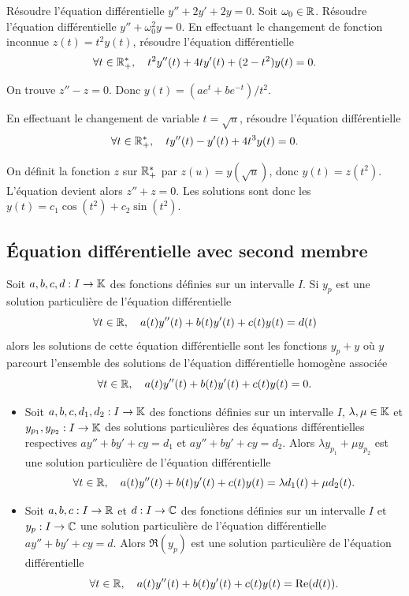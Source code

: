 \documentclass{magnolia}
\begin{document}
\begin{exos}
\exo Résoudre l'équation différentielle $y''+2y'+2y=0$.
\exo Soit $\omega_0\in\mathbb{R}$. Résoudre l'équation différentielle
  $y''+\omega_0^2 y=0$.
\exo En effectuant le changement de fonction inconnue $z(t)= t^2 y(t)$,
  résoudre l'équation différentielle
  \[\forall t\in\mathbb{R}_+^* ,\quad t^2 y''(t)+4ty'(t)+(2-t^2)y(t)=0.\]
  \begin{sol}
  On trouve $z''-z=0$. Donc $y(t)=(ae^t+be^{-t})/t^2$.
  \end{sol}
\exo En effectuant le changement de variable $t=\sqrt{u}$, résoudre
  l'équation différentielle
  \[\forall t\in\mathbb{R}_+^* ,\quad ty''(t)-y'(t)+4t^3y(t)=0.\]
  \begin{sol}
  On définit la fonction $z$ sur $\mathbb{R}_+^*$ par $z(u)=y(\sqrt{u})$, donc
  $y(t)=z(t^2)$. L'équation devient alors $z''+z=0$. Les solutions sont donc
  les $y(t)=c_1\cos(t^2)+c_2\sin(t^2)$.
  \end{sol}
\end{exos}

\subsection{Équation différentielle avec second membre}

\begin{proposition}[utile=-3,nom={Théorème de superposition}]
Soit $a,b,c,d:I\to\mathbb{K}$ des fonctions définies sur un intervalle $I$.
Si $y_p$ est une solution \og particulière \fg de l'équation différentielle
\[\forall t\in\mathbb{R} ,\quad a(t)y''(t)+b(t)y'(t)+c(t)y(t)=d(t)\]
alors les solutions de cette équation différentielle sont les fonctions $y_p+y$
où $y$ parcourt l'ensemble des solutions de l'équation différentielle homogène
associée
\[\forall t\in\mathbb{R} ,\quad a(t)y''(t)+b(t)y'(t)+c(t)y(t)=0.\]
\end{proposition}


\begin{proposition}[utile=-3,nom={Théorème de superposition}]
\begin{itemize}
\item Soit $a,b,c,d_1,d_2:I\to\mathbb{K}$ des fonctions définies sur un intervalle $I$, $\lambda,\mu\in\mathbb{K}$ et $y_{p_1},y_{p_2}:I\to\mathbb{K}$ des solutions \og particulières \fg des équations
  différentielles respectives $ay''+by'+cy=d_1$ et $ay''+by'+cy=d_2$. Alors
  $\lambda y_{p_1}+\mu y_{p_2}$ est une solution \og particulière \fg de l'équation différentielle
  \[\forall t\in\mathbb{R} ,\quad a(t)y''(t)+b(t)y'(t)+c(t)y(t)=
    \lambda d_1(t)+\mu d_2(t).\]
\item Soit $a,b,c:I\to\mathbb{R}$ et $d:I\to\mathbb{C}$ des fonctions définies sur un intervalle $I$ et $y_p:I\to\mathbb{C}$ une solution
  \og particulière \fg de l'équation différentielle $ay''+by'+cy=d$. Alors
  $\Re(y_p)$ est une solution \og particulière \fg de l'équation différentielle
  \[\forall t\in \mathbb{R} ,\quad a(t)y''(t)+b(t)y'(t)+c(t)y(t)=\mathop{\rm Re}(d(t)).\]
\end{itemize}
\end{proposition}
\end{document}
